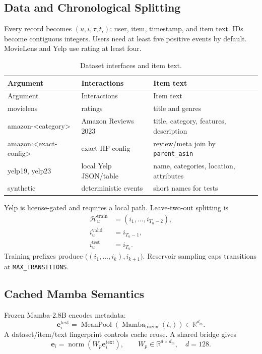 \documentclass[11pt,a4paper]{article}
\newcommand{\R}{\mathbb{R}}
\begin{document}
\subsection{Data and Chronological Splitting}

Every record becomes $(u,i,\tau,t_i)$: user, item, timestamp, and item text. IDs become contiguous integers. Users need at least five positive events by default. MovieLens and Yelp use rating at least four.

\begin{longtable}{p{}p{}p{}}
\caption{Dataset interfaces and item text.}\label{tab:data}\\
\toprule
Argument & Interactions & Item text\\
\midrule
\endfirsthead
\toprule
Argument & Interactions & Item text\\
\midrule
\endhead
movielens & ratings & title and genres\\
amazon-\textless category\textgreater & Amazon Reviews 2023 & title, category, features, description\\
amazon:\textless exact-config\textgreater & exact HF config & review/meta join by \texttt{parent\_asin}\\
yelp19, yelp23 & local Yelp JSON/table & name, categories, location, attributes\\
synthetic & deterministic events & short names for tests\\
\bottomrule
\end{longtable}

Yelp is license-gated and requires a local path. Leave-two-out splitting is
\begin{align}
  \mathcal H_u^{\mathrm{train}}&=(i_1,\ldots,i_{T_u-2}),\\
  i_u^{\mathrm{valid}}&=i_{T_u-1},\\
  i_u^{\mathrm{test}}&=i_{T_u}.
\end{align}
Training prefixes produce $\big((i_1,\ldots,i_k),i_{k+1}\big)$. Reservoir sampling caps transitions at \texttt{MAX\_TRANSITIONS}.

\subsection{Cached Mamba Semantics}

Frozen Mamba-2.8B encodes metadata:
\begin{equation}
  \bm e_i^{\mathrm{text}}
  =
  \operatorname{MeanPool}
  \left(\operatorname{Mamba}_{\mathrm{frozen}}(t_i)\right)
  \in\R^{d_m}.
\end{equation}
A dataset/item/text fingerprint controls cache reuse. A shared bridge gives
\begin{equation}
  \bm e_i=\operatorname{norm}(W_p\bm e_i^{\mathrm{text}}),
  \qquad W_p\in\R^{d\times d_m},\quad d=128.
\end{equation}
\end{document}
